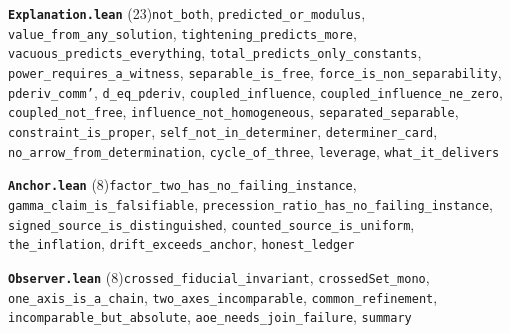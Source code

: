 \documentclass[11pt,a4paper]{article}
\theoremstyle{sudef}
\begin{document}
\noindent\textbf{\texttt{Explanation.lean}} (23)\quad \texttt{not\_\allowbreak both}, \texttt{predicted\_\allowbreak or\_\allowbreak modulus}, \texttt{value\_\allowbreak from\_\allowbreak any\_\allowbreak solution}, \texttt{tightening\_\allowbreak predicts\_\allowbreak more}, \texttt{vacuous\_\allowbreak predicts\_\allowbreak everything}, \texttt{total\_\allowbreak predicts\_\allowbreak only\_\allowbreak constants}, \texttt{power\_\allowbreak requires\_\allowbreak a\_\allowbreak witness}, \texttt{separable\_\allowbreak is\_\allowbreak free}, \texttt{force\_\allowbreak is\_\allowbreak non\_\allowbreak separability}, \texttt{pderiv\_\allowbreak comm'}, \texttt{d\_\allowbreak eq\_\allowbreak pderiv}, \texttt{coupled\_\allowbreak influence}, \texttt{coupled\_\allowbreak influence\_\allowbreak ne\_\allowbreak zero}, \texttt{coupled\_\allowbreak not\_\allowbreak free}, \texttt{influence\_\allowbreak not\_\allowbreak homogeneous}, \texttt{separated\_\allowbreak separable}, \texttt{constraint\_\allowbreak is\_\allowbreak proper}, \texttt{self\_\allowbreak not\_\allowbreak in\_\allowbreak determiner}, \texttt{determiner\_\allowbreak card}, \texttt{no\_\allowbreak arrow\_\allowbreak from\_\allowbreak determination}, \texttt{cycle\_\allowbreak of\_\allowbreak three}, \texttt{leverage}, \texttt{what\_\allowbreak it\_\allowbreak delivers}\par\smallskip
\noindent\textbf{\texttt{Anchor.lean}} (8)\quad \texttt{factor\_\allowbreak two\_\allowbreak has\_\allowbreak no\_\allowbreak failing\_\allowbreak instance}, \texttt{gamma\_\allowbreak claim\_\allowbreak is\_\allowbreak falsifiable}, \texttt{precession\_\allowbreak ratio\_\allowbreak has\_\allowbreak no\_\allowbreak failing\_\allowbreak instance}, \texttt{signed\_\allowbreak source\_\allowbreak is\_\allowbreak distinguished}, \texttt{counted\_\allowbreak source\_\allowbreak is\_\allowbreak uniform}, \texttt{the\_\allowbreak inflation}, \texttt{drift\_\allowbreak exceeds\_\allowbreak anchor}, \texttt{honest\_\allowbreak ledger}\par\smallskip
\noindent\textbf{\texttt{Observer.lean}} (8)\quad \texttt{crossed\_\allowbreak fiducial\_\allowbreak invariant}, \texttt{crossedSet\_\allowbreak mono}, \texttt{one\_\allowbreak axis\_\allowbreak is\_\allowbreak a\_\allowbreak chain}, \texttt{two\_\allowbreak axes\_\allowbreak incomparable}, \texttt{common\_\allowbreak refinement}, \texttt{incomparable\_\allowbreak but\_\allowbreak absolute}, \texttt{aoe\_\allowbreak needs\_\allowbreak join\_\allowbreak failure}, \texttt{summary}\par\smallskip
\end{document}
